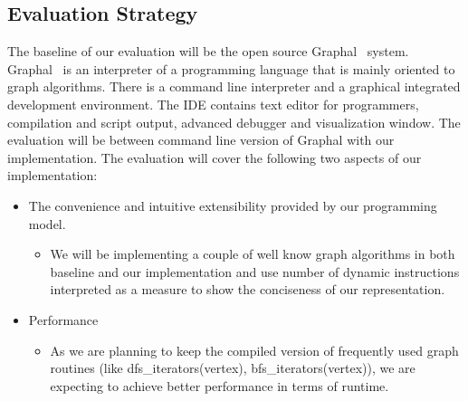\documentclass[12,twoside]{article}
\begin{document}
\subsection{Evaluation Strategy}
The baseline of our evaluation will be the open source Graphal~\cite{Graphal} 
system.  Graphal~\cite{Graphal} is an interpreter of a programming language that 
is mainly oriented to graph algorithms. There is a command line interpreter and 
a graphical integrated development environment. The IDE contains text editor for 
programmers, compilation and script output, advanced debugger and visualization 
window. The evaluation will be between command line version of Graphal with our
implementation.
  The evaluation will
  cover the following two aspects of our implementation:
  \begin{itemize}
    \item The convenience and intuitive extensibility provided by our 
    programming model.
    \begin{itemize}
      \item We will be implementing a couple of well know graph algorithms in 
      both baseline and our implementation
        and use number of dynamic instructions interpreted as a measure to show 
        the conciseness of our
        representation.
    \end{itemize}
    \item Performance
    \begin{itemize}
      \item As we are planning to keep the compiled version of frequently used 
      graph routines (like dfs\_iterators(vertex), bfs\_iterators(vertex)), we 
      are expecting to achieve better performance in terms of runtime.  
      \end{itemize}
  \end{itemize}







\end{document}
